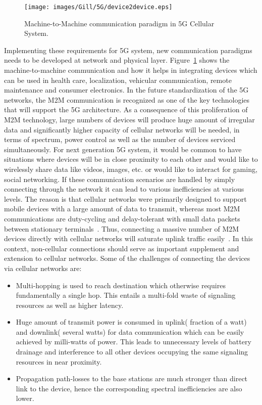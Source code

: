 \begin{figure}[!ht]
	\centering
\texttt{[image: images/Gill/5G/device2device.eps]}
	\caption{Machine-to-Machine communication paradigm in 5G Cellular System.}
	\label{d2d}
\end{figure}

Implementing these requirements for 5G system, new communication paradigms needs to be developed at network and physical layer. Figure~\ref{d2d} shows the machine-to-machine communication and how it helps in integrating devices which can be used in health care, localization, vehicular communication, remote maintenance and consumer electronics. In the future standardization of the  5G  networks, the M2M communication is  recognized as one of the key technologies that will support the 5G architecture. As a consequence of this proliferation of M2M technology, large numbers of devices will produce huge amount of irregular data and significantly higher capacity of cellular networks will be needed, in terms of spectrum, power control as well as the number of devices serviced simultaneously. For next generation 5G system, it would be common to have situations where devices will be in close proximity to each other and would like to wirelessly share data like videos, images, etc. or would like to interact for gaming, social networking. If these communication scenarios are handled by simply connecting through the network it can lead to various inefficiencies at various levels. The reason is that cellular networks were primarily designed to support mobile devices with a large amount of data to transmit, whereas most M2M  communications are duty-cycling and  delay-tolerant with small data packets between stationary terminals~\cite{laya2014random}. Thus,  connecting a massive  number  of  M2M  devices  directly  with  cellular networks will saturate uplink traffic easily~\cite{chen2014survey}. In this context, non-cellular connections should serve as important supplement and extension to cellular networks. Some of the challenges of connecting the devices via cellular networks are:

\begin{itemize}
\item Multi-hopping is used to reach destination which otherwise requires fundamentally a single hop. This entails a multi-fold waste of signaling resources as well as higher latency.

\item Huge amount of transmit power is consumed in uplink( fraction of a watt) and downlink( several watts) for data communication which can be easily achieved by milli-watts of power. This leads to unnecessary levels of battery drainage and interference to all other devices occupying the same signaling resources in near proximity.

\item Propagation path-losses to the base stations are much stronger than direct link to the device, hence the corresponding spectral inefficiencies are also lower.
\end{itemize}

